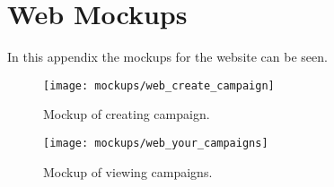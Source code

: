
\chapter{Web Mockups}
\label{app:web_mockup}

In this appendix the mockups for the website can be seen.

\begin{figure}[!htbp]
    \centering
    \texttt{[image: mockups/web\_create\_campaign]}
    \caption{Mockup of creating campaign.}
    \label{fig:web_create_campaign_mockup}
\end{figure}
\FloatBarrier

\begin{figure}[!htbp]
    \centering
    \texttt{[image: mockups/web\_your\_campaigns]}
    \caption{Mockup of viewing campaigns.}
    \label{fig:web_your_campaigns_mockup}
\end{figure}
\FloatBarrier
